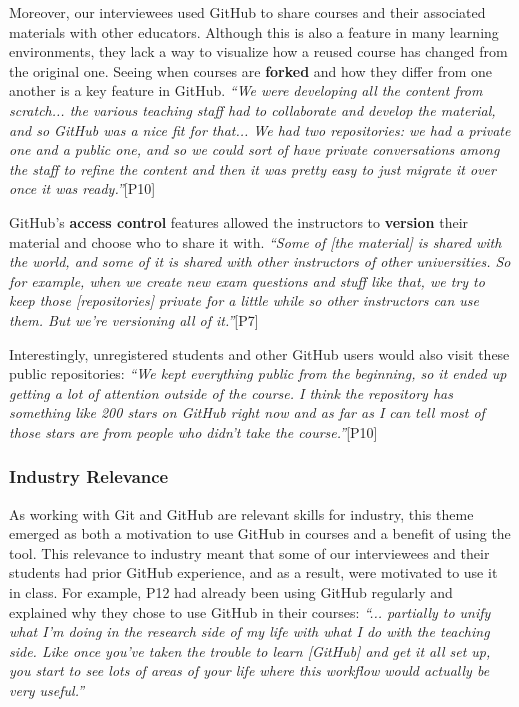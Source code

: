 Moreover, our interviewees used GitHub to share courses and their associated materials with other educators. Although this is also a feature in many learning environments, they lack a way to visualize how a reused course has changed from the original one. Seeing when courses are \textbf{forked} and how they differ from one another is a key feature in GitHub.
\textit{``We were developing all the content from scratch... the various teaching staff had to collaborate and develop the material, and so GitHub was a nice fit for that... We had two repositories: we had a private one and a public one, and so we could sort of have private conversations among the staff to refine the content and then it was pretty easy to just migrate it over once it was ready.''}[P10]

GitHub's \textbf{access control} features allowed the instructors to \textbf{version} their material and choose who to share it with. \textit{``Some of [the material] is shared with the world, and some of it is shared with other instructors of other universities. So for example, when we create new exam questions and stuff like that, we try to keep those [repositories] private for a little while so other instructors can use them. But we're versioning all of it.''}[P7]

Interestingly, unregistered students and other GitHub users would also visit these public repositories: \textit{``We kept everything public from the beginning, so it ended up getting a lot of attention outside of the course. I think the repository has something like 200 stars on GitHub right now and as far as I can tell most of those stars are from people who didn't take the course.''}[P10]

\subsubsection{Industry Relevance}
As working with Git and GitHub are relevant skills for industry, this theme emerged as both a motivation to use GitHub in courses and a benefit of using the tool. This relevance to industry meant that some of our interviewees and their students had prior GitHub experience, and as a result, were motivated to use it in class. For example, P12 had already been using GitHub regularly and explained why they chose to use GitHub in their courses: \textit{``... partially to unify what I'm doing in the research side of my life with what I do with the teaching side. Like once you've taken the trouble to learn [GitHub] and get it all set up, you start to see lots of areas of your life where this workflow would actually be very useful.''}

